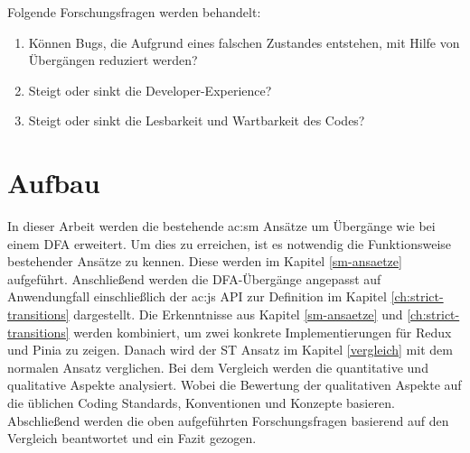 Folgende Forschungsfragen werden behandelt:

\begin{enumerate}
  \item Können Bugs, die Aufgrund eines falschen Zustandes entstehen, mit Hilfe von  Übergängen reduziert werden?
  \item Steigt oder sinkt die Developer-Experience?
  \item Steigt oder sinkt die Lesbarkeit und Wartbarkeit des Codes?
\end{enumerate}

\section{Aufbau}

In dieser Arbeit werden die bestehende \acrshort{ac:sm} Ansätze um Übergänge wie bei einem DFA erweitert. Um dies zu erreichen, ist es notwendig die Funktionsweise bestehender Ansätze zu kennen. Diese werden im Kapitel \ref{sm-ansaetze} aufgeführt. Anschließend werden die DFA-Übergänge angepasst auf Anwendungfall einschließlich der \acrlong{ac:js} API zur Definition im Kapitel \ref{ch:strict-transitions} dargestellt. Die Erkenntnisse aus Kapitel \ref{sm-ansaetze} und \ref{ch:strict-transitions} werden kombiniert, um zwei konkrete Implementierungen für Redux und Pinia zu zeigen. Danach wird der ST Ansatz im Kapitel \ref{vergleich} mit dem normalen Ansatz verglichen. Bei dem Vergleich werden die quantitative und qualitative Aspekte analysiert. Wobei die Bewertung der qualitativen Aspekte auf die üblichen Coding Standards, Konventionen und Konzepte basieren. Abschließend werden die oben aufgeführten Forschungsfragen basierend auf den Vergleich beantwortet und ein Fazit gezogen.

